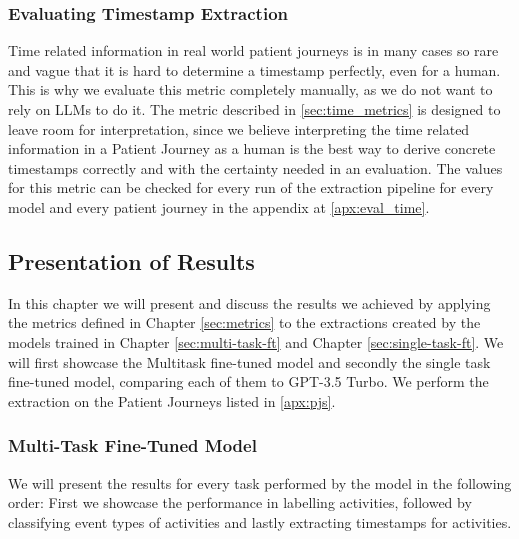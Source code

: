 \subsubsection{Evaluating Timestamp Extraction}\label{sec:eval_time}
Time related information in real world patient journeys is in many cases so rare and vague that it is hard to determine a timestamp perfectly, even for a human. This is why we evaluate this metric completely manually, as we do not want to rely on LLMs to do it. The metric described in \ref{sec:time_metrics} is designed to leave room for interpretation, since we believe interpreting the time related information in a Patient Journey as a human is the best way to derive concrete timestamps correctly and with the certainty needed in an evaluation. The values for this metric can be checked for every run of the extraction pipeline for every model and every patient journey in the appendix at \ref{apx:eval_time}.

\subsection{Presentation of Results}\label{sec:results}
In this chapter we will present and discuss the results we achieved by applying the metrics defined in Chapter \ref{sec:metrics} to the extractions created by the models trained in Chapter \ref{sec:multi-task-ft} and Chapter \ref{sec:single-task-ft}.
We will first showcase the Multitask fine-tuned model and secondly the single task fine-tuned model, comparing each of them to GPT-3.5 Turbo. We perform the extraction on the Patient Journeys listed in \ref{apx:pjs}.

\subsubsection{Multi-Task Fine-Tuned Model}\label{sec_eval_multi}
We will present the results for every task performed by the model in the following order: First we showcase the performance in labelling activities, followed by classifying event types of activities and lastly extracting timestamps for activities.

